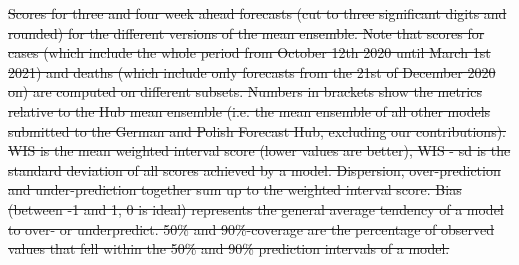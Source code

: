 \documentclass[10pt,letterpaper]{article}
\providecommand{\DIFdeltex}[1]{{\protect\color{red}\sout{#1}}}                      %
\providecommand{\DIFdelFL}[1]{\DIFdel{#1}} %
\providecommand{\DIFdel}[1]{\texorpdfstring{\DIFdeltex{#1}}{}} %
\begin{document}
{%
\DIFdelFL{Scores for three and four week ahead forecasts (cut to three significant digits and rounded) for the different versions of the mean ensemble. Note that scores for cases (which include the whole period from October 12th 2020 until March 1st 2021) and deaths (which include only forecasts from the 21st of December 2020 on) are computed on different subsets. Numbers in brackets show the metrics relative to the Hub mean ensemble (i.e. the mean ensemble of all other models submitted to the German and Polish Forecast Hub, excluding our contributions). WIS is the mean weighted interval score (lower values are better), WIS - sd is the standard deviation of all scores achieved by a model. Dispersion, over-prediction and under-prediction together sum up to the weighted interval score. Bias (between -1 and 1, 0 is ideal) represents the general average tendency of a model to over- or underpredict. 50\% and 90\%-coverage are the percentage of observed values that fell within the 50\% and 90\% prediction intervals of a model.}%
\DIFdelFL{\hspace{\textwidth}}}
\end{document}
